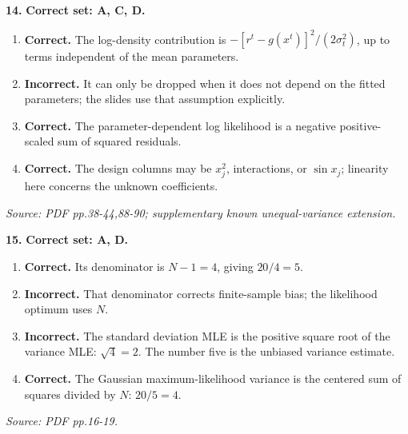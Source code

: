 \documentclass[11pt,a4paper]{article}
\begin{document}
\par\noindent\begin{minipage}{\linewidth}
\textbf{14.} \textbf{Correct set: A, C, D.}
\begin{enumerate}[label=(\Alph*),leftmargin=8mm,itemsep=2pt,topsep=2pt]
\item \textbf{Correct.} The log-density contribution is \(-[r^t-g(x^t)]^2/(2\sigma_t^2)\), up to terms independent of the mean parameters.
\item \textbf{Incorrect.} It can only be dropped when it does not depend on the fitted parameters; the slides use that assumption explicitly.
\item \textbf{Correct.} The parameter-dependent log likelihood is a negative positive-scaled sum of squared residuals.
\item \textbf{Correct.} The design columns may be \(x_j^2\), interactions, or \(\sin x_j\); linearity here concerns the unknown coefficients.
\end{enumerate}
{\footnotesize\textit{Source: PDF pp.38-44,88-90; supplementary known unequal-variance extension.}}

\end{minipage}\par\vspace{3mm}
\par\noindent\begin{minipage}{\linewidth}
\textbf{15.} \textbf{Correct set: A, D.}
\begin{enumerate}[label=(\Alph*),leftmargin=8mm,itemsep=2pt,topsep=2pt]
\item \textbf{Correct.} Its denominator is \(N-1=4\), giving \(20/4=5\).
\item \textbf{Incorrect.} That denominator corrects finite-sample bias; the likelihood optimum uses \(N\).
\item \textbf{Incorrect.} The standard deviation MLE is the positive square root of the variance MLE: \(\sqrt4=2\). The number five is the unbiased variance estimate.
\item \textbf{Correct.} The Gaussian maximum-likelihood variance is the centered sum of squares divided by \(N\): \(20/5=4\).
\end{enumerate}
{\footnotesize\textit{Source: PDF pp.16-19.}}

\end{minipage}\par\vspace{3mm}
\end{document}
